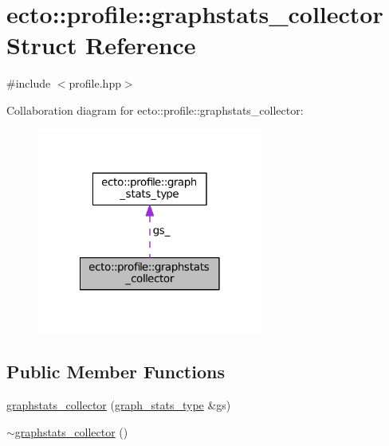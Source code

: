 \hypertarget{structecto_1_1profile_1_1graphstats__collector}{\section{ecto\-:\-:profile\-:\-:graphstats\-\_\-collector Struct Reference}
\label{structecto_1_1profile_1_1graphstats__collector}
}


{\ttfamily \#include $<$profile.\-hpp$>$}



Collaboration diagram for ecto\-:\-:profile\-:\-:graphstats\-\_\-collector\-:\nopagebreak
\begin{figure}[H]
\begin{center}
\leavevmode
\includegraphics[width=210pt]{structecto_1_1profile_1_1graphstats__collector__coll__graph}
\end{center}
\end{figure}
\subsection*{Public Member Functions}
\begin{DoxyCompactItemize}
\item 
\hyperlink{structecto_1_1profile_1_1graphstats__collector_a375c75ce1c0197d1d87a5fc1bdf97050}{graphstats\-\_\-collector} (\hyperlink{structecto_1_1profile_1_1graph__stats__type}{graph\-\_\-stats\-\_\-type} \&gs)
\item 
\hyperlink{structecto_1_1profile_1_1graphstats__collector_a1bc967dcde1e3418aeeb10e58a52d79f}{$\sim$graphstats\-\_\-collector} ()
\end{DoxyCompactItemize}
